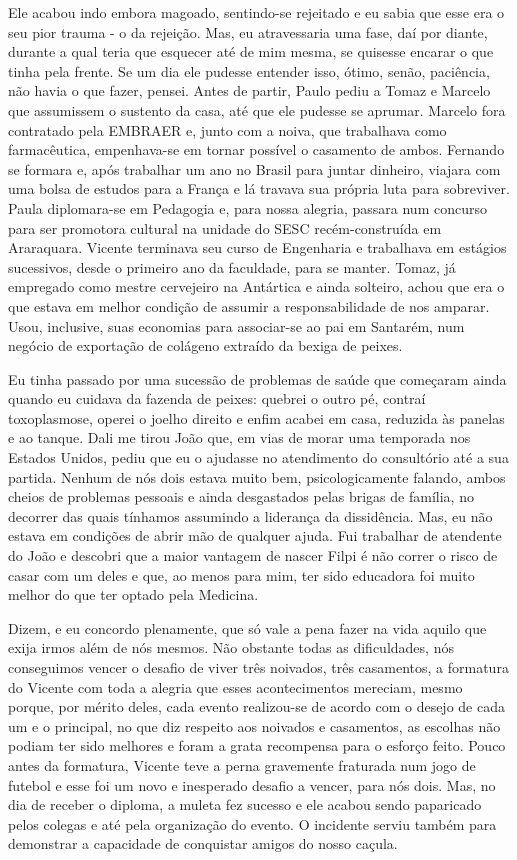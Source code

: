 Ele acabou indo embora magoado, sentindo-se rejeitado e eu sabia que esse era o seu pior trauma - o da rejeição.
Mas, eu atravessaria uma fase, daí por diante, durante a qual teria que esquecer até de mim mesma, se quisesse encarar o que tinha pela frente.
Se um dia ele pudesse entender isso, ótimo, senão, paciência, não havia o que fazer, pensei.
Antes de partir, Paulo pediu a Tomaz e Marcelo que assumissem o sustento da casa, até que ele pudesse se aprumar.
Marcelo fora contratado pela EMBRAER e, junto com a noiva, que trabalhava como farmacêutica, empenhava-se em tornar possível o casamento de ambos.
Fernando se formara e, após trabalhar um ano no Brasil para juntar dinheiro, viajara com uma bolsa de estudos para a França e lá travava sua própria luta para sobreviver.
Paula diplomara-se em Pedagogia e, para nossa alegria, passara num concurso para ser promotora cultural na unidade do SESC recém-construída em Araraquara.
Vicente terminava seu curso de Engenharia e trabalhava em estágios sucessivos, desde o primeiro ano da faculdade, para se manter.
Tomaz, já empregado como mestre cervejeiro na Antártica e ainda solteiro, achou que era o que estava em melhor condição de assumir a responsabilidade de nos amparar.
Usou, inclusive, suas economias para associar-se ao pai em Santarém, num negócio de exportação de colágeno extraído da bexiga de peixes.

Eu tinha passado por uma sucessão de problemas de saúde que começaram ainda quando eu cuidava da fazenda de peixes: quebrei o outro pé, contraí toxoplasmose, operei o joelho direito e enfim acabei em casa, reduzida às panelas e ao tanque.
Dali me tirou João que, em vias de morar uma temporada nos Estados Unidos, pediu que eu o ajudasse no atendimento do consultório até a sua partida.
Nenhum de nós dois estava muito bem, psicologicamente falando, ambos cheios de problemas pessoais e ainda desgastados pelas brigas de família, no decorrer das quais tínhamos assumindo a liderança da dissidência.
Mas, eu não estava em condições de abrir mão de qualquer ajuda.
Fui trabalhar de atendente do João e descobri que a maior vantagem de nascer Filpi é não correr o risco de casar com um deles e que, ao menos para mim, ter sido educadora foi muito melhor do que ter optado pela Medicina.

Dizem, e eu concordo plenamente, que só vale a pena fazer na vida aquilo que exija irmos além de nós mesmos.
Não obstante todas as dificuldades, nós conseguimos vencer o desafio de viver três noivados, três casamentos, a formatura do Vicente com toda a alegria que esses acontecimentos mereciam, mesmo porque, por mérito deles, cada evento realizou-se de acordo com o desejo de cada um e o principal, no que diz respeito aos noivados e casamentos, as escolhas não podiam ter sido melhores e foram a grata recompensa para o esforço feito.
Pouco antes da formatura, Vicente teve a perna gravemente fraturada num jogo de futebol e esse foi um novo e inesperado desafio a vencer, para nós dois.
Mas, no dia de receber o diploma, a muleta fez sucesso e ele acabou sendo paparicado pelos colegas e até pela organização do evento.
O incidente serviu também para demonstrar a capacidade de conquistar amigos do nosso caçula.

